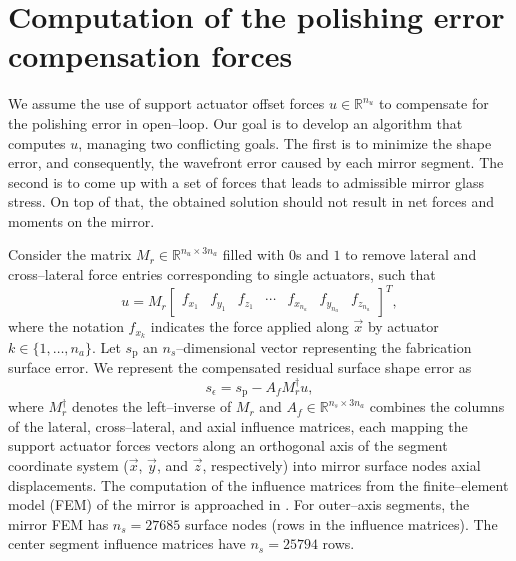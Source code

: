 \documentclass{gmto}
\begin{document}



\section{Computation of the polishing error compensation forces}
\label{sec:opt_method}

We assume the use of support actuator offset forces $u \in \mathbb{R}^{n_u}$ to compensate for the polishing error in open--loop. Our goal is to develop an algorithm that computes $u$, managing two conflicting goals. The first is to minimize the shape error, and consequently, the wavefront error caused by each mirror segment. The second is to come up with a set of forces that leads to admissible mirror glass stress. On top of that, the obtained solution should not result in net forces and moments on the mirror. 

Consider the matrix $M_r \in \mathbb{R}^{n_u \times 3n_a}$ filled with $0$s and $1$ to remove lateral and cross--lateral force entries corresponding to single actuators, such that
\begin{equation} \label{eq:alternative_u}
u = M_r
\begin{bmatrix}
f_{x_1} & f_{y_1} & f_{z_1} & \cdots & 
f_{x_{n_a}} & f_{y_{n_a}} & f_{z_{n_a}}
\end{bmatrix}^T,    
\end{equation}
where the notation $f_{x_k}$ indicates the force applied along $\vec{x}$ by actuator $k \in \{1,\ldots,n_a\}$. Let $s_{\text{p}}$ an $n_s$--dimensional vector representing the fabrication surface error. We represent the compensated residual surface shape error as 
%
\begin{equation}
\label{eq:surf_error}
s_\epsilon = s_{\text{p}} - A_f M_r^\dagger u,
\end{equation}
where $M_r^\dagger$ denotes the left--inverse of $M_r$ and $A_f \in \mathbb{R}^{n_s \times 3n_a}$ combines the columns of the lateral, cross--lateral, and axial influence matrices, each mapping the support actuator forces vectors along an orthogonal axis of the segment coordinate system ($\vec{x}$, $\vec{y}$, and $\vec{z}$, respectively) into mirror surface nodes axial displacements. The computation of the influence matrices from the finite--element model (FEM) of the mirror is approached in \cite[Section 3]{m1SupportF2017}. For outer--axis segments, the mirror FEM has $n_s = 27685$ surface nodes (rows in the influence matrices). The center segment influence matrices have $n_s = 25794$ rows.
\end{document}
